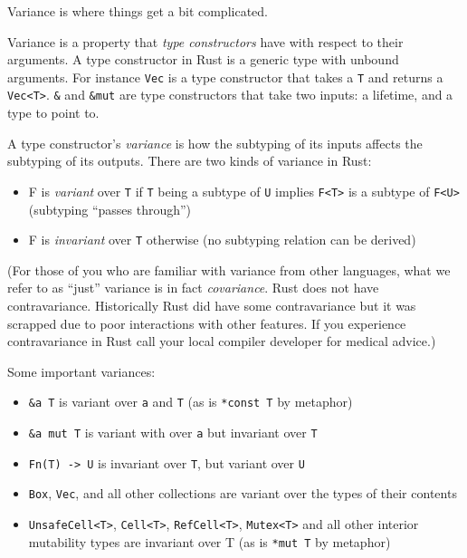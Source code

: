 \documentclass[a4paper,]{book}
\providecommand{\tightlist}{%
  \setlength{\itemsep}{0pt}\setlength{\parskip}{0pt}}
\begin{document}
Variance is where things get a bit complicated.

Variance is a property that \emph{type constructors} have with respect
to their arguments. A type constructor in Rust is a generic type with
unbound arguments. For instance \texttt{Vec} is a type constructor that
takes a \texttt{T} and returns a \texttt{Vec\textless{}T\textgreater{}}.
\texttt{\&} and \texttt{\&mut} are type constructors that take two
inputs: a lifetime, and a type to point to.

A type constructor's \emph{variance} is how the subtyping of its inputs
affects the subtyping of its outputs. There are two kinds of variance in
Rust:

\begin{itemize}
\tightlist
\item
  F is \emph{variant} over \texttt{T} if \texttt{T} being a subtype of
  \texttt{U} implies \texttt{F\textless{}T\textgreater{}} is a subtype
  of \texttt{F\textless{}U\textgreater{}} (subtyping ``passes through'')
\item
  F is \emph{invariant} over \texttt{T} otherwise (no subtyping relation
  can be derived)
\end{itemize}

(For those of you who are familiar with variance from other languages,
what we refer to as ``just'' variance is in fact \emph{covariance}. Rust
does not have contravariance. Historically Rust did have some
contravariance but it was scrapped due to poor interactions with other
features. If you experience contravariance in Rust call your local
compiler developer for medical advice.)

Some important variances:

\begin{itemize}
\tightlist
\item
  \texttt{\&\textquotesingle{}a\ T} is variant over
  \texttt{\textquotesingle{}a} and \texttt{T} (as is \texttt{*const\ T}
  by metaphor)
\item
  \texttt{\&\textquotesingle{}a\ mut\ T} is variant with over
  \texttt{\textquotesingle{}a} but invariant over \texttt{T}
\item
  \texttt{Fn(T)\ -\textgreater{}\ U} is invariant over \texttt{T}, but
  variant over \texttt{U}
\item
  \texttt{Box}, \texttt{Vec}, and all other collections are variant over
  the types of their contents
\item
  \texttt{UnsafeCell\textless{}T\textgreater{}},
  \texttt{Cell\textless{}T\textgreater{}},
  \texttt{RefCell\textless{}T\textgreater{}},
  \texttt{Mutex\textless{}T\textgreater{}} and all other interior
  mutability types are invariant over T (as is \texttt{*mut\ T} by
  metaphor)
\end{itemize}
\end{document}
